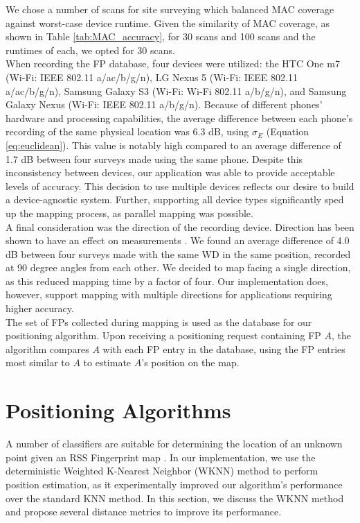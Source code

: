 \documentclass[conference]{IEEEtran}
\begin{document}
\indent We chose a number of scans for site surveying which balanced MAC coverage against worst-case device runtime. Given the similarity of MAC coverage, as shown in Table \ref{tab:MAC_accuracy}, for 30 scans and 100 scans and the runtimes of each, we opted for 30 scans.\\
\indent When recording the FP database, four devices were utilized: the HTC One m7 (Wi-Fi: IEEE 802.11 a/ac/b/g/n), LG Nexus 5  (Wi-Fi: IEEE 802.11 a/ac/b/g/n), Samsung Galaxy S3 (Wi-Fi: Wi-Fi 802.11 a/b/g/n), and Samsung Galaxy Nexus (Wi-Fi: IEEE 802.11 a/b/g/n). Because of different phones' hardware and processing capabilities, the average difference between each phone's recording of the same physical location was 6.3 dB, using $\sigma_E$ (Equation \ref{eq:euclidean}). This value is notably high compared to an average difference of 1.7 dB between four surveys made using the same phone. Despite this inconsistency between devices, our application was able to provide acceptable levels of accuracy. This decision to use multiple devices reflects our desire to build a device-agnostic system. Further, supporting all device types significantly sped up the mapping process, as parallel mapping was possible.\\
\indent A final consideration was the direction of the recording device. Direction has been shown to have an effect on measurements \cite{Sayad}. We found an average difference of 4.0 dB between four surveys made with the same WD in the same position, recorded at 90 degree angles from each other. We decided to map facing a single direction, as this reduced mapping time by a factor of four. Our implementation does, however, support mapping with multiple directions for applications requiring higher accuracy.\\
\indent The set of FPs collected during mapping is used as the database for our positioning algorithm. Upon receiving a positioning request containing FP $A$, the algorithm compares $A$ with each FP entry in the database, using the FP entries most similar to $A$ to estimate $A$'s position on the map.

\section{Positioning Algorithms}
A number of classifiers are suitable for determining the location of an unknown point given an RSS Fingerprint map \cite{Sayad2}\cite{Chaudhuri}. In our implementation, we use the deterministic Weighted K-Nearest Neighbor (WKNN) method to perform position estimation, as it experimentally improved our algorithm's performance over the standard KNN method. In this section, we discuss the WKNN method and propose several distance metrics to improve its performance. 
\end{document}
